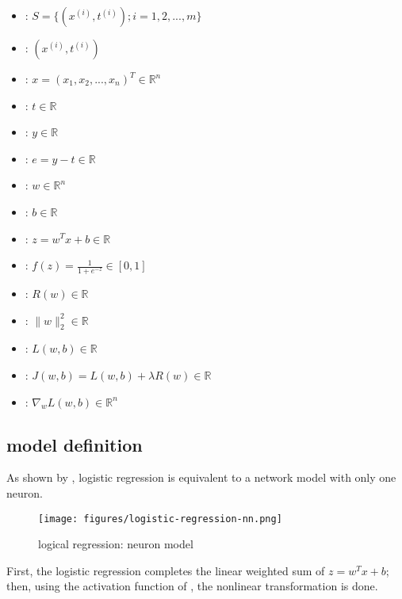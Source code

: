 \begin{content}
 \begin{itemize}
   \item {}: $ S = \{ ({x^{(i)}},{t^{(i)}});i = 1,2,...,m\} $
   \item {}: $ ({x^{(i)}},{t^{(i)}}) $
   \item {}: $ x = ({x_1},{x_2},...,{x_n})^{T} \in {\mathbb{R}^n} $
   \item {}: $ t \in {\mathbb{R}} $
   \item {}: $ y \in {\mathbb{R}} $   
   \item {}: $ e = y - t \in {\mathbb{R}} $
   \item {}: $ w \in {\mathbb{R}^{n}} $   
   \item {}: $ b \in {\mathbb{R}} $
   \item {}: $ z = w^Tx + b \in {\mathbb{R}} $   
   \item {}: $ f(z) = \frac{1}{{1 + {e^{ - z}}}} \in {[0, 1]} $
   \item {}: $ R(w) \in {\mathbb{R}} $
   \item {}: $ \parallel w\parallel _2^2 \in {\mathbb{R}} $
   \item {}: $ L(w, b) \in {\mathbb{R}} $
   \item {}: $ J(w, b) = L(w, b) + \lambda R(w)\in {\mathbb{R}} $
   \item {}: $ {\nabla _w}L( {w,b}) \in {\mathbb{R}^n} $
 \end{itemize}

\subsection{model definition}

As shown by , logistic regression is equivalent to a network model with only one neuron.

\begin{figure}[H]
\centering
\texttt{[image: figures/logistic-regression-nn.png]}
\caption{logical regression: neuron model}
 \label{fig:logistic-regression-nn}
\end{figure}

First, the logistic regression completes the linear weighted sum of $z = {w^T}x + b$; then, using the activation function of , the nonlinear transformation is done.


\end{content}
